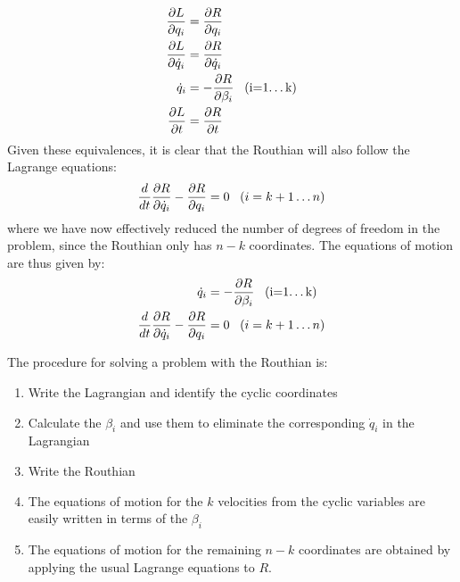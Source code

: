 \begin{align}
\frac{\partial L}{\partial q_i}&=\frac{\partial R}{\partial q_i}\nonumber\\
\frac{\partial L}{\partial \dot{q}_i}&=\frac{\partial R}{\partial \dot{q}_i}\nonumber\\
\dot{q}_i&=-\frac{\partial R}{\partial \beta_i}\;\;\;\text{(i=1\dots k)}\nonumber\\
\frac{\partial L}{\partial t}&=\frac{\partial R}{\partial t}
\end{align}
Given these equivalences, it is clear that the Routhian will also follow the Lagrange equations:
\begin{align}
\frac{d}{dt}\frac{\partial R}{\partial \dot{q}_i}-\frac{\partial R}{\partial q_i}=0\;\;\;(i=k+1\dots n)
\end{align}
where we have now effectively reduced the number of degrees of freedom in the problem, since the Routhian only has $n-k$ coordinates. The equations of motion are thus given by:
\begin{align}
\dot{q}_i&=-\frac{\partial R}{\partial \beta_i}\;\;\;\text{(i=1\dots k)}\nonumber\\
\frac{d}{dt}\frac{\partial R}{\partial \dot{q}_i}-\frac{\partial R}{\partial q_i}&=0\;\;\;(i=k+1\dots n)
\end{align}

The procedure for solving a problem with the Routhian is:
\begin{enumerate}
\item Write the Lagrangian and identify the cyclic coordinates
\item Calculate the $\beta_i$ and use them to eliminate the corresponding $\dot{q}_i$ in the Lagrangian
\item Write the Routhian
\item The equations of motion for the $k$ velocities from the cyclic variables are easily written in terms of the $\beta_i$ 
\item The equations of motion for the remaining $n-k$ coordinates are obtained by applying the usual Lagrange equations to $R$.
\end{enumerate}

